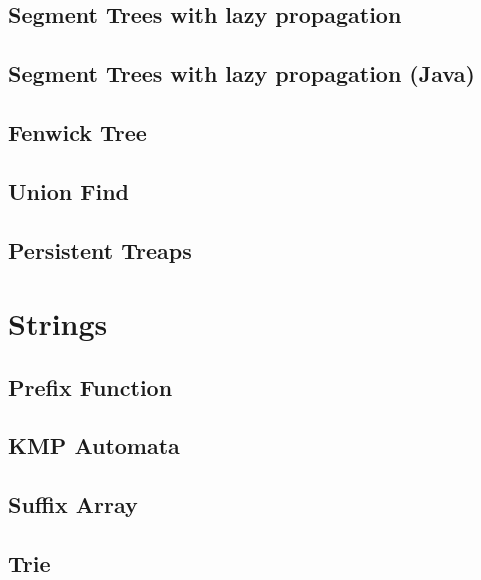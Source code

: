 \subsection{Segment Trees with lazy propagation}
\raggedbottom
\hrulefill
\subsection{Segment Trees with lazy propagation (Java)}
\raggedbottom
\hrulefill
\subsection{Fenwick Tree}
\raggedbottom
\hrulefill
\subsection{Union Find}
\raggedbottom
\hrulefill
\subsection{Persistent Treaps}
\raggedbottom
\hrulefill

\section{Strings}
\subsection{Prefix Function}
\raggedbottom
\hrulefill
\subsection{KMP Automata}
\raggedbottom
\hrulefill
\subsection{Suffix Array}
\raggedbottom
\hrulefill
\subsection{Trie}
\raggedbottom
\hrulefill
